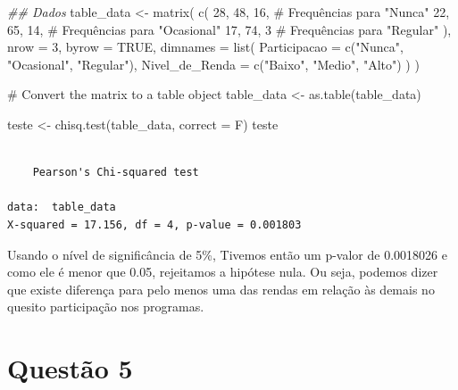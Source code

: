 \documentclass[
  letterpaper,
  DIV=11,
  numbers=noendperiod]{scrartcl}
\newenvironment{Shaded}{\begin{snugshade}}{\end{snugshade}}
\newcommand{\AttributeTok}[1]{\textcolor[rgb]{0.40,0.45,0.13}{#1}}
\newcommand{\CommentTok}[1]{\textcolor[rgb]{0.37,0.37,0.37}{#1}}
\newcommand{\ConstantTok}[1]{\textcolor[rgb]{0.56,0.35,0.01}{#1}}
\newcommand{\DecValTok}[1]{\textcolor[rgb]{0.68,0.00,0.00}{#1}}
\newcommand{\DocumentationTok}[1]{\textcolor[rgb]{0.37,0.37,0.37}{\textit{#1}}}
\newcommand{\FunctionTok}[1]{\textcolor[rgb]{0.28,0.35,0.67}{#1}}
\newcommand{\NormalTok}[1]{\textcolor[rgb]{0.00,0.23,0.31}{#1}}
\newcommand{\OtherTok}[1]{\textcolor[rgb]{0.00,0.23,0.31}{#1}}
\newcommand{\StringTok}[1]{\textcolor[rgb]{0.13,0.47,0.30}{#1}}
\begin{document}
\begin{Shaded}
\begin{Highlighting}[]
\DocumentationTok{\#\# Dados}
\NormalTok{table\_data }\OtherTok{\textless{}{-}} \FunctionTok{matrix}\NormalTok{(}
  \FunctionTok{c}\NormalTok{(}
    \DecValTok{28}\NormalTok{, }\DecValTok{48}\NormalTok{, }\DecValTok{16}\NormalTok{,  }\CommentTok{\# Frequências para "Nunca"}
    \DecValTok{22}\NormalTok{, }\DecValTok{65}\NormalTok{, }\DecValTok{14}\NormalTok{,  }\CommentTok{\# Frequências para "Ocasional"}
    \DecValTok{17}\NormalTok{, }\DecValTok{74}\NormalTok{, }\DecValTok{3}    \CommentTok{\# Frequências para "Regular"}
\NormalTok{  ),}
  \AttributeTok{nrow =} \DecValTok{3}\NormalTok{, }\AttributeTok{byrow =} \ConstantTok{TRUE}\NormalTok{,}
  \AttributeTok{dimnames =} \FunctionTok{list}\NormalTok{(}
    \AttributeTok{Participacao =} \FunctionTok{c}\NormalTok{(}\StringTok{"Nunca"}\NormalTok{, }\StringTok{"Ocasional"}\NormalTok{, }\StringTok{"Regular"}\NormalTok{),}
    \AttributeTok{Nivel\_de\_Renda =} \FunctionTok{c}\NormalTok{(}\StringTok{"Baixo"}\NormalTok{, }\StringTok{"Medio"}\NormalTok{, }\StringTok{"Alto"}\NormalTok{)}
\NormalTok{  )}
\NormalTok{)}

\CommentTok{\# Convert the matrix to a table object}
\NormalTok{table\_data }\OtherTok{\textless{}{-}} \FunctionTok{as.table}\NormalTok{(table\_data)}

\NormalTok{teste }\OtherTok{\textless{}{-}} \FunctionTok{chisq.test}\NormalTok{(table\_data, }\AttributeTok{correct =}\NormalTok{ F)}
\NormalTok{teste}
\end{Highlighting}
\end{Shaded}

\begin{verbatim}

    Pearson's Chi-squared test

data:  table_data
X-squared = 17.156, df = 4, p-value = 0.001803
\end{verbatim}

Usando o nível de significância de 5\%, Tivemos então um p-valor de
0.0018026 e como ele é menor que 0.05, rejeitamos a hipótese nula. Ou
seja, podemos dizer que existe diferença para pelo menos uma das rendas
em relação às demais no quesito participação nos programas.

\section{Questão 5}\label{questuxe3o-5}
\end{document}
